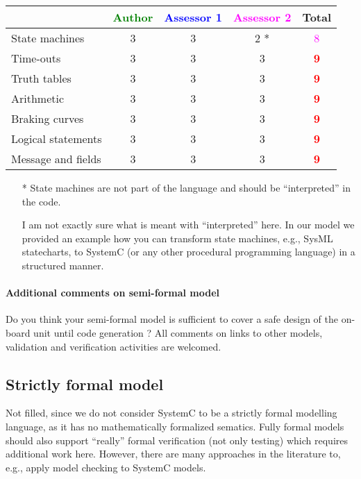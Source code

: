\begin{tabular}{|l | c | c | c | c|}
\hline
& \textcolor{green}{Author} & \textcolor{blue}{Assessor 1} & \textcolor{magenta}{Assessor 2} & Total \\
\hline
State machines &3 &3 & 2    * & \textcolor{magenta}{8} \\
\hline
Time-outs &3 &3 &3 & \textcolor{red}{\textbf{9}} \\
\hline
Truth tables &3 &3 &3 & \textcolor{red}{\textbf{9}} \\
\hline
Arithmetic &3 &3 &3 & \textcolor{red}{\textbf{9}} \\
\hline
Braking curves &3 &3 &3 & \textcolor{red}{\textbf{9}} \\
\hline
Logical statements &3 &3 &3 & \textcolor{red}{\textbf{9}} \\
\hline
Message and fields &3 &3 &3 & \textcolor{red}{\textbf{9}} \\
\hline
\end{tabular}

\begin{assessor2}
  \begin{itemize}
  \item[*] State machines are not part of the language and should be
    ``interpreted'' in the code.
\begin{author_comment}
I am not exactly sure what is meant with ``interpreted'' here. In our model we provided an example how you can transform state machines, e.g., SysML statecharts, to SystemC (or any other procedural programming language) in a structured manner.
\end{author_comment}
  \end{itemize}  
\end{assessor2}



\paragraph{Additional comments on semi-formal model} Do you think your semi-formal model is sufficient to cover a safe design of the on-board unit until code generation ?
All comments on links to other models, validation and verification activities are welcomed.

\subsection{Strictly formal model}

\begin{author_comment}
Not filled, since we do not consider SystemC to be a strictly formal modelling language, as it has no mathematically formalized sematics. Fully formal models should also support ``really'' formal verification (not only testing) which requires additional work here. However, there are many approaches in the literature to, e.g., apply model checking to SystemC models.
\end{author_comment}


